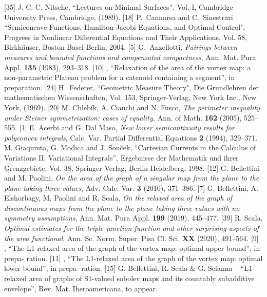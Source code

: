  [35] {\sc J. C. C. Nitsche}, ``Lectures on Minimal Surfaces'', Vol. I, Cambridge University Press, Cambridge, (1989).
 [18] {\sc P.~Cannarsa and C.~Sinestrari} {``Semiconcave Functions, Hamilton-Jacobi Equations, and Optimal Control"}, Progress in Nonlinear Differential Equations and Their Applications, Vol. 58, Birkh\"auser, Boston-Basel-Berlin, 2004.
 [5] {\sc G.~Anzellotti}, \emph{Pairings between measures and bounded functions and compensated compactness}, {Ann. Mat. Pura Appl.} {\bf 135} (1983), 293--318. %
 [10] , “Relaxation of the area of the vortex map: a non-parametric Plateau problem for a catenoid containing a segment”, in preparation.
 [24] {\sc H.~Federer}, {``Geometric Measure Theory"}, Die Grundlehren der mathematischen Wissenschaften, Vol. 153, Springer-Verlag, New York Inc., New York, (1969).
 [20] {\sc M. Chleb\'ik, A. Cianchi and N. Fusco,} \emph{The perimeter inequality under Steiner symmetrization: cases of equality,} Ann. of Math. \textbf{162} (2005), 525--555. %
 [1] {\sc E. Acerbi and G. Dal Maso}, \emph{New lower semicontinuity results for polyconvex integrals}, Calc. Var. Partial Differential Equations \textbf{2} (1994), 329--371. %
 {\sc M. Giaquinta, G. Modica and J. Sou\u{c}ek}, ``Cartesian Currents in the Calculus of Variations II. Variational Integrals'', Ergebnisse der Mathematik und ihrer Grenzgebiete, Vol. 38, Springer-Verlag, Berlin-Heidelberg, 1998. %
 [12] {\sc G. Bellettini and M. Paolini}, \emph{On the area of the graph of a singular map from the plane to the plane taking three values}, Adv. Calc. Var. \textbf{3} (2010), 371--386. %
 [7] {\sc G. Bellettini, A. Elshorbagy, M. Paolini and R. Scala}, \emph{On the relaxed area of the graph of discontinuous maps from the plane to the plane taking three values with no symmetry assumptions}, Ann. Mat. Pura Appl. \textbf{199} (2019), 445--477. %
 [39] {\sc R. Scala}, \emph{Optimal estimates for the triple junction function and other surprising aspects of the area functional}, { Ann. Sc. Norm. Super. Pisa Cl. Sci.} {\bf XX} (2020), 491--564.
 [9] , “The L1-relaxed area of the graph of the vortex map: optimal upper bound”, in prepa- ration.
 [11] , “The L1-relaxed area of the graph of the vortex map: optimal lower bound”, in prepa- ration.
 [15] G. Bellettini, R. Scala & G. Scianna – “L1-relaxed area of graphs of S1-valued sobolev maps and its countably subadditive envelope”, Rev. Mat. Iberoamericana, to appear.
